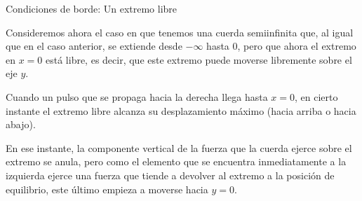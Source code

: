 \documentclass[11pt,handout,aspectratio=1610]{beamer}
\newcommand{\vs}{\vspace{11pt}}
\begin{document}
\begin{frame}{Condiciones de borde: Un extremo libre}

    Consideremos ahora el caso en que tenemos una cuerda semiinfinita que, al igual que en el caso anterior, se extiende desde $-\infty$ hasta $0$, pero que ahora el extremo en $x = 0$ está libre, es decir, que este extremo puede moverse libremente sobre el eje $y$. 
    
    \vs 
    
    Cuando un pulso que se propaga hacia la derecha llega hasta $x = 0$, en cierto instante el extremo libre alcanza su desplazamiento máximo (hacia arriba o hacia abajo). 
    
    \vs 
    
    En ese instante, la componente vertical de la fuerza que la cuerda ejerce sobre el extremo se anula, pero como el elemento que se encuentra inmediatamente a la izquierda ejerce una fuerza que tiende a devolver al extremo a la posición de equilibrio, este último empieza a moverse hacia $y = 0$. 
    
\end{frame}
\end{document}
